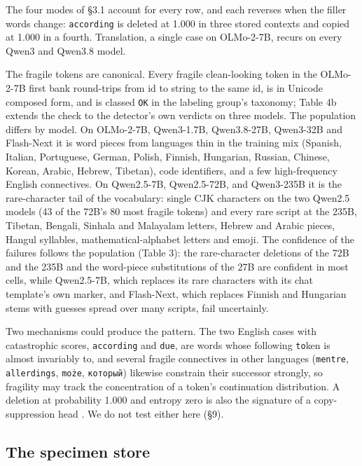 \documentclass[11pt]{article}
\begin{document}
The four modes of §3.1 account for every row, and each reverses when the filler words change: \texttt{according} is deleted at 1.000 in three stored contexts and copied at 1.000 in a fourth. Translation, a single case on OLMo-2-7B, recurs on every Qwen3 and Qwen3.8 model.

The fragile tokens are canonical. Every fragile clean-looking token in the OLMo-2-7B first bank round-trips from id to string to the same id, is in Unicode composed form, and is classed \texttt{OK} in the labeling group's taxonomy; Table 4b extends the check to the detector's own verdicts on three models. The population differs by model. On OLMo-2-7B, Qwen3-1.7B, Qwen3.8-27B, Qwen3-32B and Flash-Next it is word pieces from languages thin in the training mix (Spanish, Italian, Portuguese, German, Polish, Finnish, Hungarian, Russian, Chinese, Korean, Arabic, Hebrew, Tibetan), code identifiers, and a few high-frequency English connectives. On Qwen2.5-7B, Qwen2.5-72B, and Qwen3-235B it is the rare-character tail of the vocabulary: single CJK characters on the two Qwen2.5 models (43 of the 72B's 80 most fragile tokens) and every rare script at the 235B, Tibetan, Bengali, Sinhala and Malayalam letters, Hebrew and Arabic pieces, Hangul syllables, mathematical-alphabet letters and emoji. The confidence of the failures follows the population (Table 3): the rare-character deletions of the 72B and the 235B and the word-piece substitutions of the 27B are confident in most cells, while Qwen2.5-7B, which replaces its rare characters with its chat template's own marker, and Flash-Next, which replaces Finnish and Hungarian stems with guesses spread over many scripts, fail uncertainly.

Two mechanisms could produce the pattern. The two English cases with catastrophic scores, \texttt{according} and \texttt{due}, are words whose following \texttt{to}ken is almost invariably to, and several fragile connectives in other languages (\texttt{mentre}, \texttt{allerdings}, \texttt{może}, \texttt{{\fbfree\upshape который}}) likewise constrain their successor strongly, so fragility may track the concentration of a token's continuation distribution. A deletion at probability 1.000 and entropy zero is also the signature of a copy-suppression head \citep{mcdougall2023}. We do not test either here (§9).

\subsection{The specimen store}\label{the-specimen-store}
\end{document}
